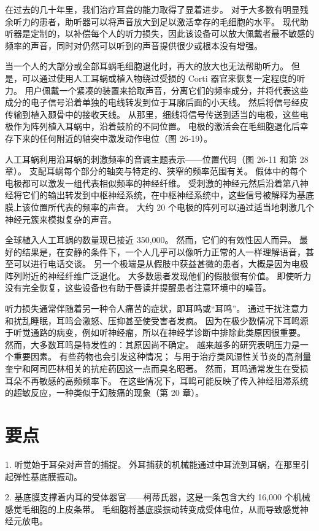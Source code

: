 在过去的几十年里，我们治疗耳聋的能力取得了显着进步。 对于大多数有明显残余听力的患者，助听器可以将声音放大到足以激活幸存的毛细胞的水平。 现代助听器是定制的，以补偿每个人的听力损失，因此该设备可以放大佩戴者最不敏感的频率的声音，同时对仍然可以听到的声音提供很少或根本没有增强。

当一个人的大部分或全部耳蜗毛细胞退化时，再大的放大也无法帮助听力。 但是，可以通过使用人工耳蜗或植入物绕过受损的 Corti 器官来恢复一定程度的听力。 用户佩戴一个紧凑的装置来拾取声音，分离它们的频率成分，并将代表这些成分的电子信号沿着单独的电线转发到位于耳廓后面的小天线。 然后将信号经皮传输到植入颞骨中的接收天线。 从那里，细线将信号传送到适当的电极，这些电极作为阵列植入耳蜗中，沿着鼓阶的不同位置。 电极的激活会在毛细胞退化后幸存下来的任何附近的轴突中激发动作电位（图 26-19）。

人工耳蜗利用沿耳蜗的刺激频率的音调主题表示——位置代码（图 26-11 和第 28 章）。 支配耳蜗每个部分的轴突与特定的、狭窄的频率范围有关。 假体中的每个电极都可以激发一组代表相似频率的神经纤维。 受刺激的神经元然后沿着第八神经将它们的输出转发到中枢神经系统，在中枢神经系统中，这些信号被解释为基底膜上该位置所代表的频率的声音。 大约 20 个电极的阵列可以通过适当地刺激几个神经元簇来模拟复杂的声音。

全球植入人工耳蜗的数量现已接近 350,000。 然而，它们的有效性因人而异。 最好的结果是，在安静的条件下，一个人几乎可以像听力正常的人一样理解语音，甚至可以进行电话交谈。 另一个极端是从假肢中获益甚微的患者，大概是因为电极阵列附近的神经纤维广泛退化。 大多数患者发现他们的假肢很有价值。 即使听力没有完全恢复，这些设备也有助于唇读并提醒患者注意环境中的噪音。

听力损失通常伴随着另一种令人痛苦的症状，即耳鸣或“耳鸣”。 通过干扰注意力和扰乱睡眠，耳鸣会激怒、压抑甚至使受害者发疯。 因为在极少数情况下耳鸣源于听觉通路的病变，例如听神经瘤，所以在神经学诊断中排除此类原因很重要。 然而，大多数耳鸣是特发性的：其原因尚不确定。 越来越多的研究表明压力是一个重要因素。 有些药物也会引发这种情况； 与用于治疗类风湿性关节炎的高剂量奎宁和阿司匹林相关的抗疟药因这一点而臭名昭著。 然而，耳鸣通常发生在受损耳朵不再敏感的高频频率下。 在这些情况下，耳鸣可能反映了传入神经阻滞系统的超敏反应，一种类似于幻肢痛的现象（第 20 章）。


\section{要点}
1. 听觉始于耳朵对声音的捕捉。 外耳捕获的机械能通过中耳流到耳蜗，在那里引起弹性基底膜振动。 

2. 基底膜支撑着内耳的受体器官——柯蒂氏器，这是一条包含大约 16,000 个机械感觉毛细胞的上皮条带。 毛细胞将基底膜振动转变成受体电位，从而导致感觉神经元放电。 

